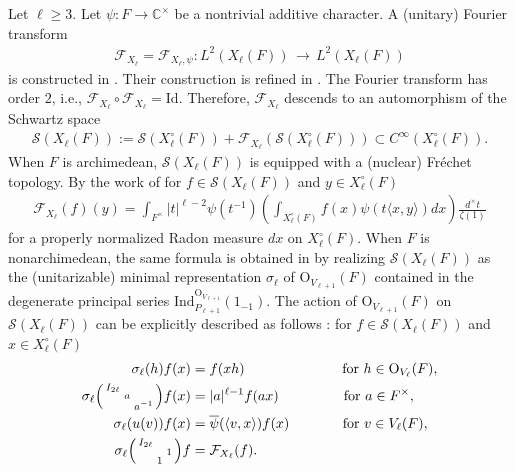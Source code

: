 \documentclass[11pt,a4paper,reqno]{amsart}
\theoremstyle{remark}
\numberwithin{equation}{section}
\newcommand{\lto}{\,\longrightarrow\,}
\newcommand{\CC}{\mathbb{C}}
\theoremstyle{definition}
\numberwithin{equation}{section}
\newenvironment{psmatrix}
  {\left(\begin{smallmatrix}}
  {\end{smallmatrix}\right)}
\begin{document}
Let $\ell\ge 3$. Let $\psi:F\to \CC^\times$ be a nontrivial additive character. A (unitary) Fourier transform
\begin{align*}
    \mathcal{F}_{X_{\ell}}=\mathcal{F}_{X_{\ell},\psi}:L^2(X_\ell(F))\lto L^2(X_\ell(F))
\end{align*}
is constructed in \cite{BKnormalized}. Their construction is refined in \cite{Getz:Hsu:Leslie}. The Fourier transform has order $2$, i.e.,
 $\mathcal{F}_{X_\ell}\circ \mathcal{F}_{X_\ell}=\mathrm{Id}.$ Therefore, $\mathcal{F}_{X_{\ell}}$ descends to an automorphism of the Schwartz space 
\begin{align*}
    \mathcal{S}(X_{\ell}(F)):=\mathcal{S}(X_{\ell}^\circ(F))+\mathcal{F}_{X_{\ell}}
(\mathcal{S}(X_\ell^\circ(F)))\subset C^
\infty(X_{\ell}^\circ(F)).
\end{align*}
When $F$ is archimedean, $\mathcal{S}(X_{\ell}(F))$ is equipped with a (nuclear) Fr\'echet topology.
By the work of \cite{Getz:Hsu:Leslie, Hsu:asymptotics} for $f\in \mathcal{S}(X_{\ell}(F))$ and $y\in X_{\ell}^\circ(F)$
\begin{align*}
    \mathcal{F}_{X_{\ell}}(f)(y)=\int_{F^\times} |t|^{\ell-2}\psi(t^{-1}) \left(\int_{X_{\ell}^\circ(F)} f(x)\psi(t\langle x,y\rangle)dx\right) \frac{d^\times t}{\zeta(1)}
\end{align*}
for a properly normalized Radon measure $dx$ on $X_{\ell}^\circ(F)$. When $F$ is nonarchimedean, the same formula is obtained in \cite{GK:cone} by realizing $\mathcal{S}(X_{\ell}(F))$ as the (unitarizable) minimal representation $\sigma_\ell$ of $\mathrm{O}_{V_{\ell+1}}(F)$ contained in the degenerate principal series $\mathrm{Ind}_{P_{\ell+1}}^{\mathrm{O}_{V_{\ell+1}}}(1_{-1}).$ The action of $\mathrm{O}_{V_{\ell+1}}(F)$ on $\mathcal{S}(X_{\ell}(F))$ can be explicitly described as follows \cite{GK:cone}: for $f\in \mathcal{S}(X_\ell(F))$ and $x\in X_{\ell}^\circ(F)$
\begin{align}\label{eq:minimal:act}  
    \begin{split}
    \sigma_\ell(h)f(x)&=f(xh) \quad\quad\quad\quad\quad\quad\quad  \textrm{for } h\in \mathrm{O}_{V_\ell}(F),\\
       \sigma_\ell\begin{psmatrix}
            I_{2\ell} & &\\
            & a &\\
            & & a^{-1}
        \end{psmatrix}f(x)&=|a|^{\ell-1} f(ax) \quad\quad\quad\quad\,\,\,\, \textrm{for }a\in F^\times,\\
        \sigma_\ell(u(v))f(x)&=\overline{\psi}(\langle v,x\rangle)f(x) \quad\quad\quad\,\,\,\,\, \textrm{for }v\in V_{\ell}(F),\\
        \sigma_\ell \begin{psmatrix}
            I_{2\ell} & &\\
             & & 1\\
             &1 &
        \end{psmatrix}f&=\mathcal{F}_{X_\ell}(f).
    \end{split}
\end{align}
\end{document}
